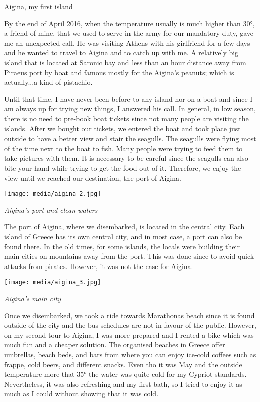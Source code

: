 \documentclass[10pt,a4paper]{article} %
\newcommand{\NewsItem}[1]{ %
\usefont{T1}{fvs}{n}{n} %
\vspace{24pt}\large #1\vspace{3pt} %
\par \normalsize \normalfont}
\begin{document}
\begin{multicols}{3}
\NewsItem{Aigina, my first island}
By the end of April 2016, when the temperature usually is much higher than \ang{30}, 
a friend of mine, that we used to serve in the army for our mandatory duty, gave me 
an unexpected call. 
He was visiting Athens with his girlfriend for a few days and he wanted to travel to 
Aigina and to catch up with me.
A relatively big island that is located at Saronic bay and less than an hour 
distance away from Piraeus port by boat and famous mostly for the Aigina's peanuts; 
which is actually...a kind of pistachio. 

Until that time, I have never been before to any island nor on a boat and since 
I am always up for trying new things, I answered his call. 
In general, in low season, there is no need to pre-book boat tickets since not 
many people are visiting the islands. 
After we bought our tickets, we entered the boat and took place just outside
to have a better view and stair the seagulls.  
The seagulls were flying most of the time next to the boat to fish. 
Many people were trying to feed them to take pictures with them. 
It is necessary to be careful since the seagulls can also bite your hand while 
trying to get the food out of it. 
Therefore, we enjoy the view until we reached our destination, the port of Aigina. 

\begin{center}
	\texttt{[image: media/aigina\_2.jpg]}
	\par\textit{Aigina's port and clean waters}
\end{center}

The port of Aigina, where we disembarked, is located in the central city. 
Each island of Greece has its own central city, and in most case,
a port can also be found there. 
In the old times, for some islands, the locals were building their main cities 
on mountains away from the port. 
This was done since to avoid quick attacks from pirates. 
However, it was not the case for Aigina. 

\begin{center}
	\texttt{[image: media/aigina\_3.jpg]}
	\par\textit{Aigina's main city}
\end{center}

Once we disembarked, we took a ride towards Marathonas beach since it is found 
outside of the city and the bus schedules are not in favour of the public. 
However, on my second tour to Aigina, I was more prepared and I rented a bike which 
was much fun and a cheaper solution.
The organised beaches in Greece offer umbrellas, beach beds, and bars from where 
you can enjoy ice-cold coffees such as frappe, cold beers, and different snacks. 
Even tho it was May and the outside temperature more that \ang{35} the water was 
quite cold for my Cypriot standards. 
Nevertheless, it was also refreshing and my first bath, so I tried to enjoy it 
as much as I could without showing that it was cold. 


\end{multicols}
\end{document}
